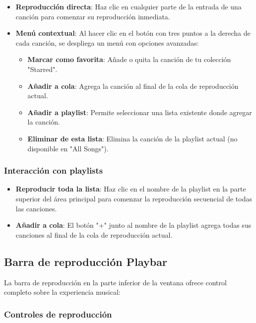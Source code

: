 \documentclass[11pt, a4paper]{article}
\begin{document}
    \begin{itemize}
      \item \textbf{Reproducción directa}: Haz clic en cualquier parte de la entrada de una canción para comenzar su reproducción inmediata.
        
      \item \textbf{Menú contextual}: Al hacer clic en el botón con tres puntos a la derecha de cada canción, se despliega un menú con opciones avanzadas:
      \begin{itemize}
        \item \textbf{Marcar como favorita}: Añade o quita la canción de tu colección "Starred".
        \item \textbf{Añadir a cola}: Agrega la canción al final de la cola de reproducción actual.
        \item \textbf{Añadir a playlist}: Permite seleccionar una lista existente donde agregar la canción.
        \item \textbf{Eliminar de esta lista}: Elimina la canción de la playlist actual (no disponible en "All Songs").  
      \end{itemize}
    \end{itemize}

    \subsubsection{Interacción con playlists}

    \begin{itemize}
      \item \textbf{Reproducir toda la lista}: Haz clic en el nombre de la playlist en la parte superior del área principal para comenzar la reproducción secuencial de todas las canciones.
        
      \item \textbf{Añadir a cola}: El botón "+" junto al nombre de la playlist agrega todas sus canciones al final de la cola de reproducción actual.
    \end{itemize}

  \subsection{Barra de reproducción Playbar}

  La barra de reproducción en la parte inferior de la ventana ofrece control completo sobre la experiencia musical:

    \subsubsection{Controles de reproducción}
\end{document}
